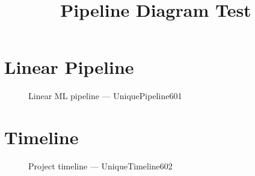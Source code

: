 \documentclass{SUSTechHomework}
\title{Pipeline Diagram Test}
\begin{document}
\maketitle

\section{Linear Pipeline}

\begin{figure}[htbp]
  \centering
  \begin{sustechpipelinediagram}
  \end{sustechpipelinediagram}
  \caption{Linear ML pipeline — UniquePipeline601}
\end{figure}

\section{Timeline}

\begin{figure}[htbp]
  \centering
  \begin{sustechoverviewtimeline}
  \end{sustechoverviewtimeline}
  \caption{Project timeline — UniqueTimeline602}
\end{figure}
\end{document}
